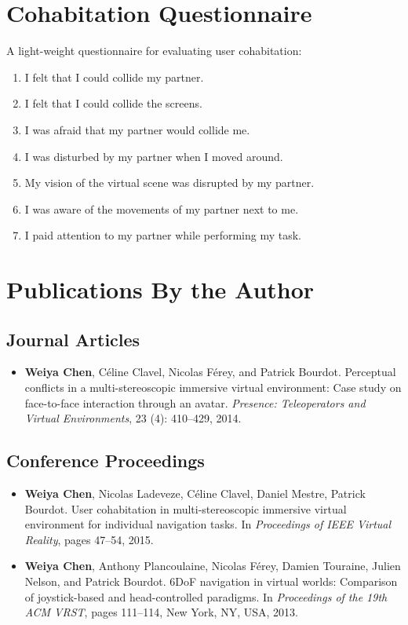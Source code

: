 \begin{appendices}
\chapter{Cohabitation Questionnaire}
\label{appendix:cohab_q}
A light-weight questionnaire for evaluating user cohabitation:
\begin{enumerate}
	\item I felt that I could collide my partner.
	\item I felt that I could collide the screens.
	\item I was afraid that my partner would collide me.
	\item I was disturbed by my partner when I moved around.
	\item My vision of the virtual scene was disrupted by my partner.
	\item I was aware of the movements of my partner next to me.
	\item I paid attention to my partner while performing my task.
\end{enumerate}

\chapter{Publications By the Author}

\section*{Journal Articles}

\begin{itemize}
\item \textbf{Weiya Chen}, C\'eline Clavel, Nicolas F\'erey, and Patrick Bourdot. Perceptual conflicts in a multi-stereoscopic immersive virtual environment: Case study on face-to-face interaction through an avatar. \textit{Presence: Teleoperators and Virtual Environments}, 23 (4): 410–429, 2014.
\end{itemize}


\section*{Conference Proceedings}

\begin{itemize}
\item \textbf{Weiya Chen}, Nicolas Ladeveze, C\'eline Clavel, Daniel Mestre, Patrick Bourdot. User cohabitation in multi-stereoscopic immersive virtual environment for individual navigation tasks. In \textit{Proceedings of IEEE Virtual Reality}, pages 47–54, 2015.

\item \textbf{Weiya Chen}, Anthony Plancoulaine, Nicolas F\'erey, Damien Touraine, Julien Nelson, and Patrick Bourdot. 6DoF navigation in virtual worlds: Comparison of joystick-based and head-controlled paradigms. In \textit{Proceedings of the 19th ACM VRST}, pages 111–114, New York, NY, USA, 2013.
\end{itemize}





\end{appendices}